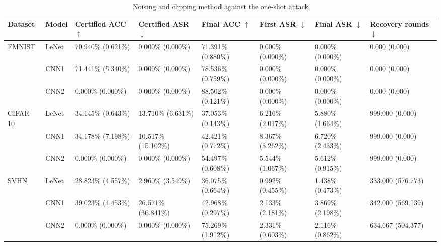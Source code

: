 \documentclass[conference,compsoc]{IEEEtran}
\begin{document}
\begin{landscape}
\begin{table}[H]
\centering
\caption{Noising and clipping method against the one-shot attack}
\begin{tabular}{llllllll}
\hline
\textbf{Dataset} & \textbf{Model} & \textbf{Certified ACC} $\uparrow$ & \textbf{Certified ASR} $\downarrow$ & \textbf{Final ACC} $\uparrow$ & \textbf{First ASR} $\downarrow$ & \textbf{Final ASR} $\downarrow$ & \textbf{Recovery rounds} $\downarrow$ \\
\hline
\multirow{3}{*}{FMNIST} & LeNet & 70.940\% (0.621\%) & 0.000\% (0.000\%) & 71.391\% (0.880\%) & 0.000\% (0.000\%) & 0.000\% (0.000\%) & 0.000 (0.000) \\
& CNN1 & 71.441\% (5.340\%) & 0.000\% (0.000\%) & 78.536\% (0.759\%) & 0.000\% (0.000\%) & 0.000\% (0.000\%) & 0.000 (0.000) \\
& CNN2 & 0.000\% (0.000\%) & 0.000\% (0.000\%) & 88.502\% (0.121\%) & 0.000\% (0.000\%) & 0.000\% (0.000\%) & 0.000 (0.000) \\
\hline
\multirow{3}{*}{CIFAR-10} & LeNet & 34.145\% (0.643\%) & 13.710\% (6.631\%) & 37.053\% (0.143\%) & 6.216\% (2.017\%) & 5.880\% (1.664\%) & 999.000 (0.000) \\
& CNN1 & 34.178\% (7.198\%) & 10.517\% (15.102\%) & 42.421\% (0.772\%) & 8.367\% (3.262\%) & 6.720\% (2.433\%) & 999.000 (0.000) \\
& CNN2 & 0.000\% (0.000\%) & 0.000\% (0.000\%) & 54.497\% (0.608\%) & 5.544\% (1.067\%) & 5.612\% (0.915\%) & 999.000 (0.000) \\
\hline
\multirow{3}{*}{SVHN} & LeNet & 28.823\% (4.557\%) & 2.960\% (3.549\%) & 36.075\% (0.664\%) & 0.992\% (0.455\%) & 1.438\% (0.473\%) & 333.000 (576.773) \\
& CNN1 & 39.023\% (4.453\%) & 26.571\% (36.841\%) & 42.968\% (0.297\%) & 2.133\% (2.181\%) & 3.869\% (2.198\%) & 342.000 (569.139) \\
& CNN2 & 0.000\% (0.000\%) & 0.000\% (0.000\%) & 75.269\% (1.912\%) & 2.331\% (0.603\%) & 2.116\% (0.862\%) & 634.667 (504.377) \\
\hline
\end{tabular}
\end{table}


\end{landscape}
\end{document}
